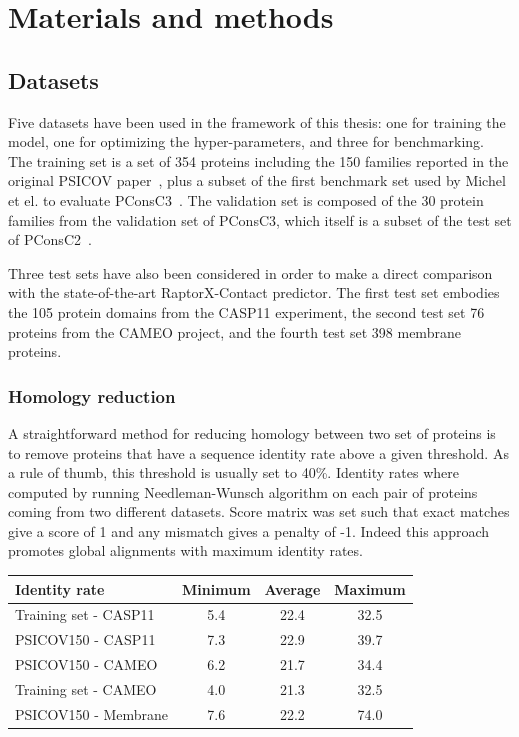 \chapter{Materials and methods}

\section{Datasets}

  Five datasets have been used in the framework of this thesis:
  one for training the model, one for optimizing the hyper-parameters, and three for benchmarking.
  The training set is a set of 354 proteins including the 150 families reported in the original PSICOV
  paper~\cite{doi:10.1093/bioinformatics/btr638}, plus a subset of the first benchmark set used by
  Michel et el. to evaluate PConsC3~\cite{Skwark079673}.
  The validation set is composed of the 30 protein families from the validation set of PConsC3,
  which itself is a subset of the test set of PConsC2~\cite{10.1371/journal.pcbi.1003889}.

  Three test sets have also been considered in order to make a direct comparison with the state-of-the-art RaptorX-Contact predictor.
  The first test set embodies the 105 protein domains from the CASP11 experiment, the second test set 76 proteins from the CAMEO
  project, and the fourth test set 398 membrane proteins.

  \subsection{Homology reduction}

    A straightforward method for reducing homology between two set of proteins is to
    remove proteins that have a sequence identity rate above a given threshold.
    As a rule of thumb, this threshold is usually set to 40\%.
    Identity rates where computed by running Needleman-Wunsch algorithm on each
    pair of proteins coming from two different datasets. Score matrix was set
    such that exact matches give a score of 1 and any mismatch gives a penalty of -1.
    Indeed this approach promotes global alignments with maximum identity rates.

    \begin{table}[H]
      \centering
      \begin{tabular}{|l|c|c|c|}
        \hline
        Identity rate & Minimum & Average & Maximum \\
        \hline
        \hline
        Training set - CASP11 & 5.4 & 22.4 & 32.5 \\
        PSICOV150 - CASP11 & 7.3 & 22.9 & 39.7 \\
        PSICOV150 - CAMEO & 6.2 & 21.7 & 34.4 \\
        Training set - CAMEO & 4.0 & 21.3 & 32.5 \\
        PSICOV150 - Membrane & 7.6 & 22.2 & 74.0 \\
        \hline
      \end{tabular}
      \label{identityrates}
    \end{table}


